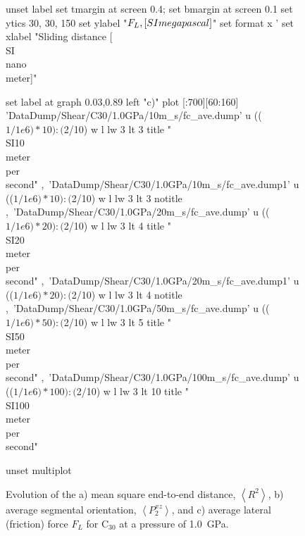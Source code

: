 \documentclass[5p]{elsarticle}
\begin{document}
\begin{figure}[htp]
\begin{center}
\begin{gnuplot}[terminal=epslatex, terminaloptions={size \SERFigwidth cm, \SERFigheight cm color solid}]
			unset label
			set tmargin at screen 0.4; set bmargin at screen 0.1
			set ytics 30, 30, 150 
			set ylabel "$F_L \\, [\\SI{}{\\mega\\pascal}]$" 
			set format x '%
			set xlabel "Sliding distance [\\SI{}{\\nano\\meter}]"  

			set label at graph 0.03,0.89 left "c)"
			plot  [:700][60:160]	'DataDump/Shear/C30/1.0GPa/10m_s/fc_ave.dump' u (($1/1e6)*10):($2/10) w l  lw 3    lt 3    title  "\\SI{10}{\\meter\\per\\second}"   ,\
			'DataDump/Shear/C30/1.0GPa/10m_s/fc_ave.dump1' u (($1/1e6)*10):($2/10) w l  lw 3    lt 3    notitle    ,\
							'DataDump/Shear/C30/1.0GPa/20m_s/fc_ave.dump' u (($1/1e6)*20):($2/10) w l  lw 3    lt 4    title  "\\SI{20}{\\meter\\per\\second}"   ,\
							'DataDump/Shear/C30/1.0GPa/20m_s/fc_ave.dump1' u (($1/1e6)*20):($2/10) w l  lw 3    lt 4    notitle    ,\
							'DataDump/Shear/C30/1.0GPa/50m_s/fc_ave.dump' u (($1/1e6)*50):($2/10) w l  lw 3     lt 5    title  "\\SI{50}{\\meter\\per\\second}"  ,\
							'DataDump/Shear/C30/1.0GPa/100m_s/fc_ave.dump' u (($1/1e6)*100):($2/10) w l  lw 3   lt 10    title  "\\SI{100}{\\meter\\per\\second}"  

			unset multiplot
		\end{gnuplot}

		\caption{Evolution of the a) mean square end-to-end distance, $\left< R^2 \right>$, b) average segmental orientation, $\left<P_{2}^{xz}\right>$, and c) average lateral (friction) force $F_L$ for C$_{30}$ at a pressure of \SI{1.0}{\giga\pascal}.}
		\label{fig:SS}
	\end{center}
 \end{figure}
\end{document}
